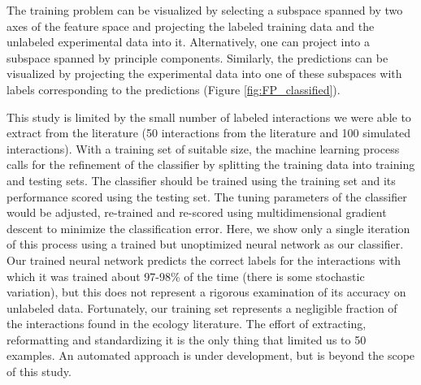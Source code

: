 The training problem can be visualized by selecting a subspace spanned by two axes of the feature space and projecting the labeled training data and the unlabeled experimental data into it. Alternatively, one can project into a subspace spanned by principle components. Similarly, the predictions can be visualized by projecting the experimental data into one of these subspaces with labels corresponding to the predictions (Figure \ref{fig:FP_classified}).



This study is limited by the small number of labeled interactions we were able to extract from the literature (50 interactions from the literature and 100 simulated interactions). With a training set of suitable size, the machine learning process calls for the refinement of the classifier by splitting the training data into training and testing sets. The classifier should be trained using the training set and its performance scored using the testing set. The tuning parameters of the classifier would be adjusted, re-trained and re-scored using multidimensional gradient descent to minimize the classification error. Here, we show only a single iteration of this process using a trained but unoptimized neural network as our classifier. Our trained neural network predicts the correct labels for the interactions with which it was trained about 97-98\% of the time (there is some stochastic variation), but this does not represent a rigorous examination of its accuracy on unlabeled data. Fortunately, our training set represents a negligible fraction of the interactions found in the ecology literature. The effort of extracting, reformatting and standardizing it is the only thing that limited us to 50 examples. An automated approach is under development, but is beyond the scope of this study.